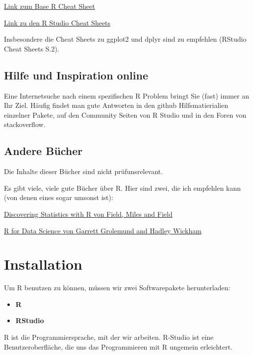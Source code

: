 \documentclass[
]{book}
\providecommand{\tightlist}{%
  \setlength{\itemsep}{0pt}\setlength{\parskip}{0pt}}
\begin{document}
\href{https://cran.r-project.org/doc/contrib/Short-refcard.pdf}{Link zum Base R Cheat Sheet}

\href{https://www.rstudio.com/resources/cheatsheets/}{Link zu den R Studio Cheat Sheets}

Insbesondere die Cheat Sheets zu ggplot2 und dplyr sind zu empfehlen (RStudio Cheat Sheets S.2).

\section{Hilfe und Inspiration online}\label{hilfe-und-inspiration-online}

Eine Internetsuche nach einem spezifischen R Problem bringt Sie (fast) immer an Ihr Ziel. Häufig findet man gute Antworten in den github Hilfsmatierialien einzelner Pakete, auf den Community Seiten von R Studio und in den Foren von stackoverflow.

\section{Andere Bücher}\label{andere-buxfccher}

Die Inhalte dieser Bücher sind nicht prüfunsrelevant.

Es gibt viele, viele gute Bücher über R. Hier sind zwei, die ich empfehlen kann (von denen eines sogar umsonst ist):

\href{https://www.amazon.com/Discovering-Statistics-Using-Andy-Field/dp/1446200469/ref=sr_1_2?ie=UTF8&qid=1487759316&sr=8-2&keywords=statistics+with+r}{Discovering Statistics with R von Field, Miles and Field}

\href{http://r4ds.had.co.nz}{R for Data Science von Garrett Grolemund and Hadley Wickham}

\chapter{Installation}\label{installation}

Um R benutzen zu können, müssen wir zwei Softwarepakete herunterladen:

\begin{itemize}
\tightlist
\item
  \textbf{R}
\item
  \textbf{RStudio}
\end{itemize}

R ist die Programmiersprache, mit der wir arbeiten. R-Studio ist eine Benutzeroberfläche, die uns das Programmieren mit R ungemein erleichtert.
\end{document}
